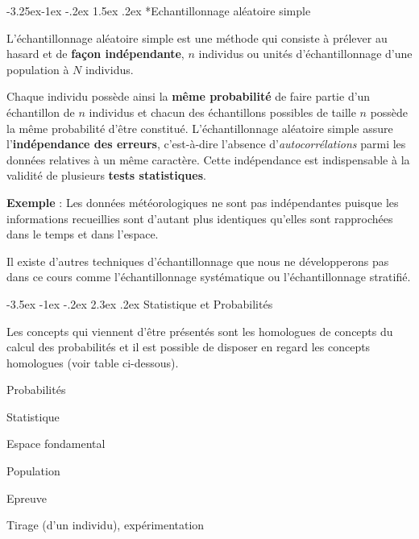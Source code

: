 \documentclass[]{book}
\makeatletter
\renewcommand\section{\@startsection {section}{1}{\z@}%
                                   {-3.5ex \@plus -1ex \@minus -.2ex}%
                                   {2.3ex \@plus.2ex}%
                                   {\normalfont\Large\bfseries\color{ForestGreen}}}
\renewcommand\subsection{\@startsection{subsection}{2}{\z@}%
                                     {-3.25ex\@plus -1ex \@minus -.2ex}%
                                     {1.5ex \@plus .2ex}%
                                     {\normalfont\large\bfseries\color{Violet}}}
\theoremstyle{magentacolor}
\theoremstyle{proprie}
\theoremstyle{exstyle}
\theoremstyle{exostyle}
\theoremstyle{definition}
\theoremstyle{definition}
\theoremstyle{definition}
\theoremstyle{remark}
\let\BeginKnitrBlock\begin \let\EndKnitrBlock\end
\makeatother
\begin{document}
\hypertarget{echantillonnage-aleatoire-simple}{%
\subsection*{Echantillonnage aléatoire simple}\label{echantillonnage-aleatoire-simple}}

\BeginKnitrBlock{definition}
\protect\hypertarget{def:unnamed-chunk-98}{}{\label{def:unnamed-chunk-98} }L'échantillonnage aléatoire simple est une méthode qui consiste à prélever au hasard et
de \textbf{façon indépendante}, \(n\) individus ou unités d'échantillonnage d'une population à
\(N\) individus.
\EndKnitrBlock{definition}

Chaque individu possède ainsi la \textbf{même probabilité} de faire partie d'un échantillon de \(n\)
individus et chacun des échantillons possibles de taille \(n\) possède la même probabilité d'être
constitué.
L'échantillonnage aléatoire simple assure l'\textbf{indépendance des erreurs}, c'est-à-dire l'absence
d'\emph{autocorrélations} parmi les données relatives à un même caractère. Cette indépendance est
indispensable à la validité de plusieurs \textbf{tests statistiques}.

\textbf{Exemple} : Les données météorologiques ne sont pas indépendantes puisque les informations recueillies sont d'autant plus identiques qu'elles sont rapprochées dans le temps et dans l'espace.

Il existe d'autres techniques d'échantillonnage que nous ne développerons pas dans ce cours comme l'échantillonnage systématique ou l'échantillonnage stratifié.

\hypertarget{statistique-et-probabilites}{%
\section{Statistique et Probabilités}\label{statistique-et-probabilites}}

Les concepts qui viennent d'être présentés sont les homologues de concepts du calcul des
probabilités et il est possible de disposer en regard les concepts homologues (voir table ci-dessous).

Probabilités

Statistique

Espace fondamental

Population

Epreuve

Tirage (d'un individu), expérimentation
\end{document}
